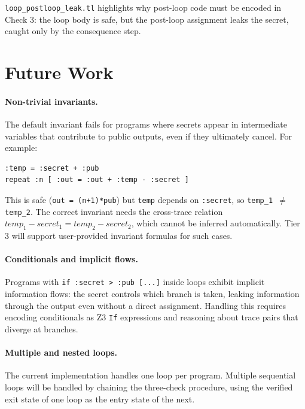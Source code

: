 \documentclass[11pt,a4paper]{article}
\begin{document}
\texttt{loop\_postloop\_leak.tl} highlights why post-loop code must be encoded
in Check 3: the loop body is safe, but the post-loop assignment leaks the
secret, caught only by the consequence step.

\section{Future Work}

\paragraph{Non-trivial invariants.}
The default invariant fails for programs where secrets appear in intermediate
variables that contribute to public outputs, even if they ultimately cancel. For
example:
\begin{lstlisting}[style=code]
:temp = :secret + :pub
repeat :n [ :out = :out + :temp - :secret ]
\end{lstlisting}
This is safe (\texttt{out = (n+1)*pub}) but \texttt{temp} depends on
\texttt{:secret}, so \texttt{temp\_1 $\neq$ temp\_2}. The correct invariant
needs the cross-trace relation $\mathit{temp}_1 - \mathit{secret}_1 =
\mathit{temp}_2 - \mathit{secret}_2$, which cannot be inferred automatically.
Tier 3 will support user-provided invariant formulas for such cases.

\paragraph{Conditionals and implicit flows.}
Programs with \texttt{if :secret > :pub [...]} inside loops exhibit implicit
information flows: the secret controls which branch is taken, leaking
information through the output even without a direct assignment. Handling this
requires encoding conditionals as Z3 \texttt{If} expressions and reasoning
about trace pairs that diverge at branches.

\paragraph{Multiple and nested loops.}
The current implementation handles one loop per program. Multiple sequential
loops will be handled by chaining the three-check procedure, using the verified
exit state of one loop as the entry state of the next.
\end{document}
